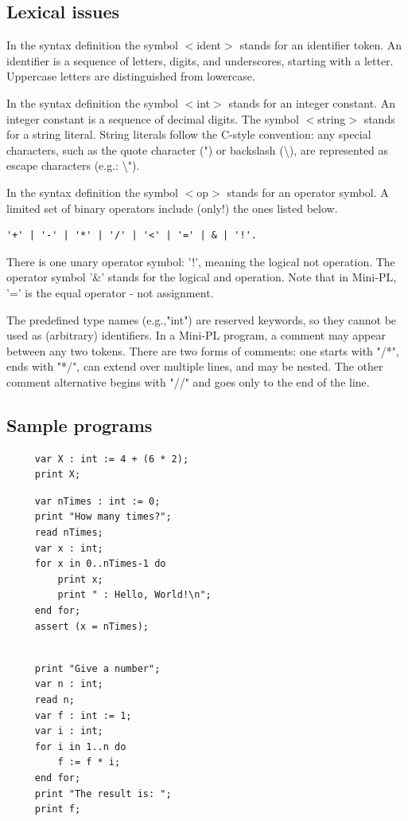 \documentclass[english,11pt,twoside,a4paper]{article}
\begin{document}
\subsection{Lexical issues}

In the syntax definition the symbol $<$ident$>$ stands for an identifier token. An identifier is a sequence of letters, digits, and underscores, starting with a letter. Uppercase letters are distinguished from lowercase.
 
In the syntax definition the symbol $<$int$>$ stands for an integer constant. An integer constant is a sequence of decimal digits. The symbol $<$string$>$ stands for a string literal. String literals follow the C-style convention: any special characters, such as the quote character (") or backslash (\textbackslash), are represented as escape characters (e.g.: \textbackslash"). 
 
In the syntax definition the symbol $<$op$>$ stands for an operator symbol. A limited set of binary operators include (only!) the ones listed below. 
 \begin{lstlisting}
'+' | '-' | '*' | '/' | '<' | '=' | & | '!'. 
 \end{lstlisting}
There is one unary operator symbol: '!', meaning the logical not operation. The operator symbol '\&' stands for the logical and operation. Note that in Mini-PL, '=' is the equal operator - not assignment. 
 
The predefined type names (e.g.,"int") are reserved keywords, so they cannot be used as (arbitrary) identifiers. In a Mini-PL program, a comment may appear between any two tokens. There are two forms of comments: one starts with "/*", ends with "*/", can extend over multiple lines, and may be nested. The other comment alternative begins with "//" and goes only to the end of the line. 


\subsection{Sample programs}
\begin{lstlisting}
     var X : int := 4 + (6 * 2);
     print X;
\end{lstlisting}
\begin{lstlisting}
     var nTimes : int := 0;
     print "How many times?"; 
     read nTimes; 
     var x : int;
     for x in 0..nTimes-1 do 
         print x;
         print " : Hello, World!\n";
     end for;
     assert (x = nTimes);
\end{lstlisting}
\begin{lstlisting}

     print "Give a number"; 
     var n : int;
     read n;
     var f : int := 1;
     var i : int;
     for i in 1..n do 
         f := f * i;
     end for;
     print "The result is: ";
     print f; 
\end{lstlisting}
\end{document}
